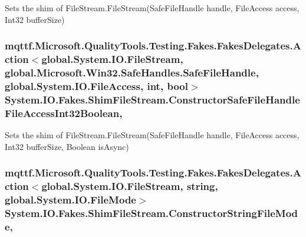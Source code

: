 Sets the shim of File\-Stream.\-File\-Stream(\-Safe\-File\-Handle handle, File\-Access access, Int32 buffer\-Size)

\hypertarget{class_system_1_1_i_o_1_1_fakes_1_1_shim_file_stream_a6b2aa67ff4e81e994c934ed2c704970f}{
\subsubsection[{Constructor\-Safe\-File\-Handle\-File\-Access\-Int32\-Boolean}]{\setlength{\rightskip}{0pt plus 5cm}mqttf.\-Microsoft.\-Quality\-Tools.\-Testing.\-Fakes.\-Fakes\-Delegates.\-Action$<$global.\-System.\-I\-O.\-File\-Stream, global.\-Microsoft.\-Win32.\-Safe\-Handles.\-Safe\-File\-Handle, global.\-System.\-I\-O.\-File\-Access, int, bool$>$ System.\-I\-O.\-Fakes.\-Shim\-File\-Stream.\-Constructor\-Safe\-File\-Handle\-File\-Access\-Int32\-Boolean\hspace{0.3cm}{\ttfamily [static]}, {\ttfamily [set]}}}\label{class_system_1_1_i_o_1_1_fakes_1_1_shim_file_stream_a6b2aa67ff4e81e994c934ed2c704970f}


Sets the shim of File\-Stream.\-File\-Stream(\-Safe\-File\-Handle handle, File\-Access access, Int32 buffer\-Size, Boolean is\-Async)

\hypertarget{class_system_1_1_i_o_1_1_fakes_1_1_shim_file_stream_a5dcdf8d4dee7cc9a634cd6c8099d288c}{
\subsubsection[{Constructor\-String\-File\-Mode}]{\setlength{\rightskip}{0pt plus 5cm}mqttf.\-Microsoft.\-Quality\-Tools.\-Testing.\-Fakes.\-Fakes\-Delegates.\-Action$<$global.\-System.\-I\-O.\-File\-Stream, string, global.\-System.\-I\-O.\-File\-Mode$>$ System.\-I\-O.\-Fakes.\-Shim\-File\-Stream.\-Constructor\-String\-File\-Mode\hspace{0.3cm}{\ttfamily [static]}, {\ttfamily [set]}}}\label{class_system_1_1_i_o_1_1_fakes_1_1_shim_file_stream_a5dcdf8d4dee7cc9a634cd6c8099d288c}


